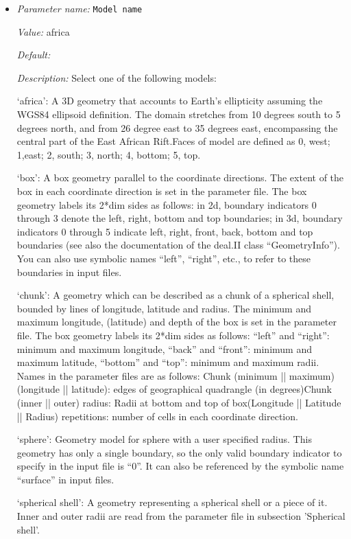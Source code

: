 \begin{itemize}
\item {\it Parameter name:} {\tt Model name}
\label{parameters:Geometry model/Model name}


{\it Value:} africa


{\it Default:} 


{\it Description:} Select one of the following models:

`africa': A 3D geometry that accounts to Earth's ellipticity assuming the WGS84 ellipsoid definition. The domain stretches from 10 degrees south to 5 degrees north, and from 26 degree east to 35 degrees east, encompassing the central part of the East African Rift.Faces of model are defined as 0, west; 1,east; 2, south; 3, north; 4, bottom; 5, top.

`box': A box geometry parallel to the coordinate directions. The extent of the box in each coordinate direction is set in the parameter file. The box geometry labels its 2*dim sides as follows: in 2d, boundary indicators 0 through 3 denote the left, right, bottom and top boundaries; in 3d, boundary indicators 0 through 5 indicate left, right, front, back, bottom and top boundaries (see also the documentation of the deal.II class ``GeometryInfo''). You can also use symbolic names ``left'', ``right'', etc., to refer to these boundaries in input files.

`chunk': A geometry which can be described as a chunk of a spherical shell, bounded by lines of longitude, latitude and radius. The minimum and maximum longitude, (latitude) and depth of the box is set in the parameter file. The box geometry labels its 2*dim sides as follows: ``left'' and ``right'': minimum and maximum longitude, ``back'' and ``front'': minimum and maximum latitude, ``bottom'' and ``top'': minimum and maximum radii. Names in the parameter files are as follows: Chunk (minimum || maximum) (longitude || latitude): edges of geographical quadrangle (in degrees)Chunk (inner || outer) radius: Radii at bottom and top of box(Longitude || Latitude || Radius) repetitions: number of cells in each coordinate direction.

`sphere': Geometry model for sphere with a user specified radius. This geometry has only a single boundary, so the only valid boundary indicator to specify in the input file is ``0''. It can also be referenced by the symbolic name ``surface'' in input files.

`spherical shell': A geometry representing a spherical shell or a piece of it. Inner and outer radii are read from the parameter file in subsection 'Spherical shell'.


\end{itemize}
